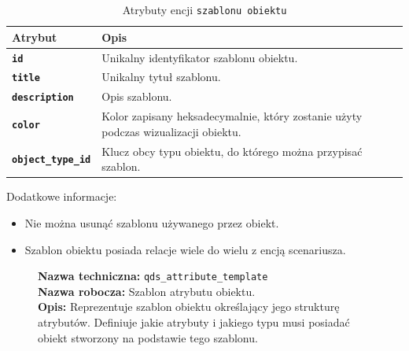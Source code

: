 \begin{table}[H]
    \centering
    \renewcommand{\arraystretch}{1.6}
    \begin{tabular}{|>{\bfseries}l|p{}|}
        \hline
        \rowcolor[HTML]{EFEFEF} \textbf{Atrybut} & \textbf{Opis} \\
        \hline
        \texttt{id} & Unikalny identyfikator szablonu obiektu. \\
        \hline
        \texttt{title} & Unikalny tytuł szablonu. \\
        \hline
        \texttt{description} & Opis szablonu. \\
        \hline
        \texttt{color} & Kolor zapisany heksadecymalnie, który zostanie użyty podczas wizualizacji obiektu. \\
        \hline
        \texttt{object\_type\_id} & Klucz obcy typu obiektu, do którego można przypisać szablon. \\
        \hline
    \end{tabular}
    \caption{Atrybuty encji \texttt{szablonu obiektu}}
\end{table}

Dodatkowe informacje:
\begin{itemize}
    \item Nie można usunąć szablonu używanego przez obiekt.
    \item Szablon obiektu posiada relacje wiele do wielu z encją scenariusza.
\end{itemize}

\begin{figure}[H]
    \centering
    \begin{minipage}{0.8\textwidth}
        \begin{framed}
            \noindent\textbf{\large Nazwa techniczna:} \texttt{qds\_attribute\_template} \\
            \textbf{\large Nazwa robocza:} Szablon atrybutu obiektu. \\
            \textbf{\large Opis:} Reprezentuje szablon obiektu określający jego strukturę atrybutów.
            Definiuje jakie atrybuty i jakiego typu musi posiadać obiekt stworzony na podstawie tego szablonu.
        \end{framed}
    \end{minipage}
\end{figure}

